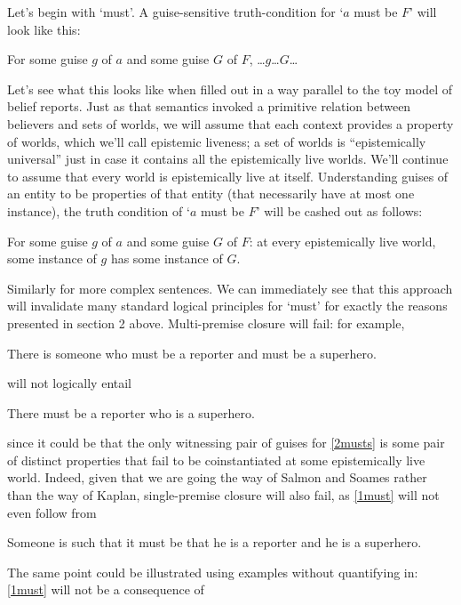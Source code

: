 \documentclass[If.tex]{subfiles}
\begin{document}
Let's begin with ‘must’.  A guise-sensitive truth-condition for ‘$a$ must be $F$’ will look like this:
\begin{prop}
    \item
    For some guise $g$ of $a$ and some guise $G$ of $F$, …$g$…$G$…
\end{prop}
Let's see what this looks like when filled out in a way parallel to the toy model of belief reports.  Just as that semantics invoked a primitive relation between believers and sets of worlds, we will assume that each context provides a property of worlds, which we'll call epistemic liveness; a set of worlds is “epistemically universal” just in case it contains all the epistemically live worlds.  We'll continue to assume that every world is epistemically live at itself.  Understanding guises of an entity to be properties of that entity (that necessarily have at most one instance), the truth condition of ‘$a$ must be $F$’ will be cashed out as follows:
\begin{prop}
    \item
    For some guise $g$ of $a$ and some guise $G$ of $F$: at every epistemically live world, some instance of $g$ has some instance of $G$.
\end{prop}
Similarly for more complex sentences.  We can immediately see that this approach will invalidate many standard logical principles for ‘must’ for exactly the reasons presented in section 2 above.  Multi-premise closure will fail: for example,
\begin{prop}
    \nitem \label{2musts}
    There is someone who must be a reporter and must be a superhero.
\end{prop}
will not logically entail
\begin{prop}
    \nitem \label{1must}
    There must be a reporter who is a superhero.
\end{prop}
since it could be that the only witnessing pair of guises for \ref{2musts} is some pair of distinct properties that fail to be coinstantiated at some epistemically live world.  Indeed, given that we are going the way of Salmon and Soames rather than the way of Kaplan, single-premise closure will also fail, as \ref{1must} will not even follow from
\begin{prop}
    \nitem \label{singlepremmust}
    Someone is such that it must be that he is a reporter and he is a superhero.
\end{prop}
The same point could be illustrated using examples without quantifying in: \ref{1must} will not be a consequence of
\end{document}
